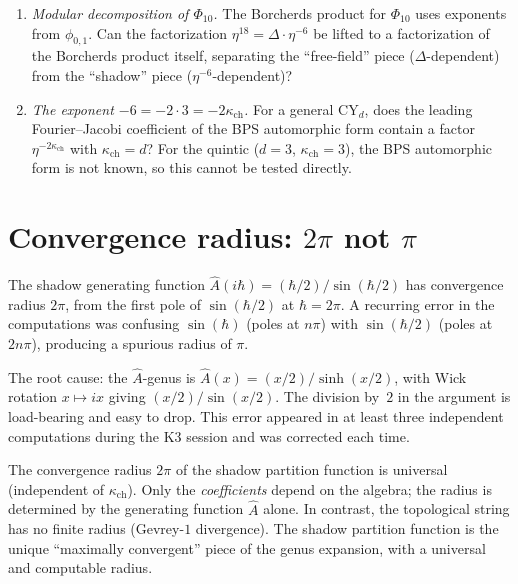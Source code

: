 \documentclass[11pt]{article}
\begin{document}
\begin{enumerate}
 \item \emph{Modular decomposition of $\Phi_{10}$.} The Borcherds product for $\Phi_{10}$ uses exponents from $\phi_{0,1}$. Can the factorization $\eta^{18} = \Delta \cdot \eta^{-6}$ be lifted to a factorization of the Borcherds product itself, separating the ``free-field'' piece ($\Delta$-dependent) from the ``shadow'' piece ($\eta^{-6}$-dependent)?

 \item \emph{The exponent $-6 = -2 \cdot 3 = -2\kappa_{\mathrm{ch}}$.} For a general CY$_d$, does the leading Fourier--Jacobi coefficient of the BPS automorphic form contain a factor $\eta^{-2\kappa_{\mathrm{ch}}}$ with $\kappa_{\mathrm{ch}} = d$? For the quintic ($d = 3$, $\kappa_{\mathrm{ch}} = 3$), the BPS automorphic form is not known, so this cannot be tested directly.
\end{enumerate}


\section{Convergence radius: $2\pi$ not $\pi$}
\label{sec:convergence-pitfall}

The shadow generating function $\hat{A}(i\hbar) = (\hbar/2)/\sin(\hbar/2)$ has convergence radius $2\pi$, from the first pole of $\sin(\hbar/2)$ at $\hbar = 2\pi$. A recurring error in the computations was confusing $\sin(\hbar)$ (poles at $n\pi$) with $\sin(\hbar/2)$ (poles at $2n\pi$), producing a spurious radius of $\pi$.

The root cause: the $\hat{A}$-genus is $\hat{A}(x) = (x/2)/\sinh(x/2)$, with Wick rotation $x \mapsto ix$ giving $(x/2)/\sin(x/2)$. The division by~$2$ in the argument is load-bearing and easy to drop. This error appeared in at least three independent computations during the K3 session and was corrected each time.

\begin{observation}
The convergence radius $2\pi$ of the shadow partition function is universal (independent of $\kappa_{\mathrm{ch}}$). Only the \emph{coefficients} depend on the algebra; the radius is determined by the generating function $\hat{A}$ alone. In contrast, the topological string has no finite radius (Gevrey-$1$ divergence). The shadow partition function is the unique ``maximally convergent'' piece of the genus expansion, with a universal and computable radius.
\end{observation}
\end{document}
